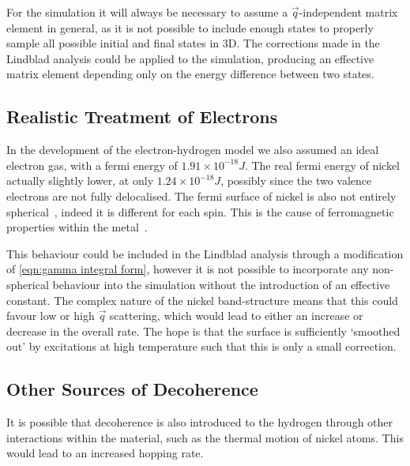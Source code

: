 For the  simulation
it will always
be necessary to assume a
\(\vec{q}\)-independent
matrix element in general,
as it is not possible
to include enough
states to properly
sample all possible initial
and final
states in 3D.
The corrections made in
the Lindblad analysis could
be applied to the simulation,
producing an effective matrix
element depending only
on the energy difference between
two states.

\subsection{Realistic Treatment of Electrons}
In the development
of the electron-hydrogen
model we also assumed
an ideal electron gas,
with a fermi energy
of \(1.91\times{}10^{-18}J\).
The real fermi energy
of nickel actually slightly lower,
at only \(1.24\times{} 10^{-18}J\),
possibly since the two
valence electrons are not
fully delocalised.
The fermi surface of nickel
is also not entirely
spherical~\cite{FermiSufaceNickel},
indeed it is different
for each spin.
This is the cause of
ferromagnetic properties
within the metal~\cite{PhysRev.49.537}.

This behaviour could
be included in the
Lindblad analysis through
a modification of \cref{eqn:gamma integral form},
however it is not possible
to incorporate any
non-spherical behaviour
into the simulation
without the introduction of
an effective constant.
The complex nature of
the nickel band-structure
means that this
could favour low or
high \(\vec{q}\) scattering,
which would lead to either an increase
or decrease in the
overall rate.
The hope
is that the surface
is sufficiently
`smoothed out' by
excitations at high
temperature such that
this is only a small
correction.

\subsection{Other Sources of Decoherence}
It is possible that decoherence is also
introduced to the hydrogen through other
interactions within the material, such
as the thermal motion of nickel atoms.
This would lead to an increased hopping rate.